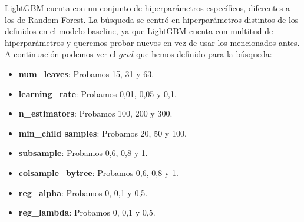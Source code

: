 LightGBM cuenta con un conjunto de hiperparámetros específicos, diferentes a los de Random Forest. La búsqueda se centró en hiperparámetros distintos de los definidos en el modelo baseline, ya que LightGBM cuenta con multitud de hiperparámetros y queremos probar nuevos en vez de usar los mencionados antes. A continuación podemos ver el $grid$ que hemos definido para la búsqueda:

\begin{itemize}
	\item \textbf{num\_leaves}: Probamos 15, 31 y 63.
	\item \textbf{learning\_rate}: Probamos 0,01, 0,05 y 0,1.
	\item \textbf{n\_estimators}: Probamos 100, 200 y 300.
	\item \textbf{min\_child samples}: Probamos 20, 50 y 100.
	\item \textbf{subsample}: Probamos 0,6, 0,8 y 1.
	\item \textbf{colsample\_bytree}: Probamos 0,6, 0,8 y 1.
	\item \textbf{reg\_alpha}: Probamos 0, 0,1 y 0,5.
	\item \textbf{reg\_lambda}: Probamos 0, 0,1 y 0,5.
\end{itemize}